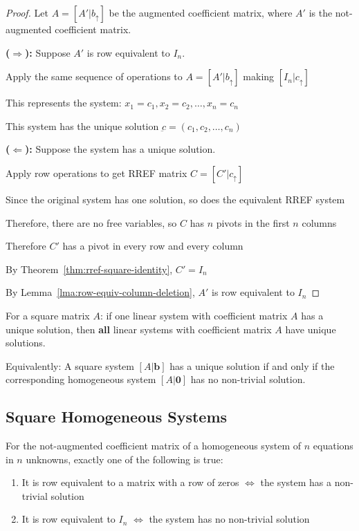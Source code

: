 \begin{proof}
    Let $A = [A' | b_{\uparrow}]$ be the augmented coefficient matrix, where $A'$ is the not-augmented coefficient matrix.
    
    \textbf{($\Rightarrow$):} Suppose $A'$ is row equivalent to $I_n$.
    
    Apply the same sequence of operations to $A = [A' | b_{\uparrow}]$ making $[I_n | c_{\uparrow}]$
    
    This represents the system: $x_1 = c_1, x_2 = c_2, \ldots, x_n = c_n$
    
    This system has the unique solution $\underbar{c}=(c_1, c_2, \ldots, c_n)$
    
    \textbf{($\Leftarrow$):} Suppose the system has a unique solution.

    Apply row operations to get RREF matrix $C = [C' | c_{\uparrow}]$

    Since the original system has one solution, so does the equivalent RREF system

    Therefore, there are no free variables, so $C$ has $n$ pivots in the first $n$ columns

    Therefore $C'$ has a pivot in every row and every column

    By Theorem~\ref{thm:rref-square-identity}, $C' = I_n$

    By Lemma~\ref{lma:row-equiv-column-deletion}, $A'$ is row equivalent to $I_n$
\end{proof}

\begin{corollary}\label{thm:square-all-or-nothing}
    For a square matrix $A$: if one linear system with coefficient matrix $A$ has a unique solution, then \textbf{all} linear systems with coefficient matrix $A$ have unique solutions.
    
    Equivalently: A square system $[A | \mathbf{b}]$ has a unique solution if and only if the corresponding homogeneous system $[A | \mathbf{0}]$ has no non-trivial solution.
\end{corollary}

\subsection{Square Homogeneous Systems}

\begin{theorem}\label{thm:square-homogeneous-dichotomy}
    For the not-augmented coefficient matrix of a homogeneous system of $n$ equations in $n$ unknowns, exactly one of the following is true:
    \begin{enumerate}
        \item It is row equivalent to a matrix with a row of zeros $\iff$ the system has a non-trivial solution
        \item It is row equivalent to $I_n$ $\iff$ the system has no non-trivial solution
    \end{enumerate}
\end{theorem}

